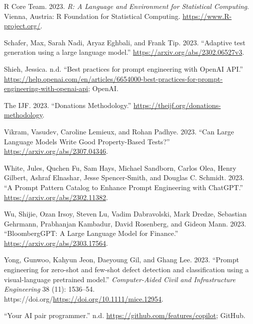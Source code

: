 \documentclass[
  letterpaper,
  DIV=11,
  numbers=noendperiod]{scrartcl}
\newlength{\cslhangindent}
\newlength{\cslentryspacingunit} %
\newenvironment{CSLReferences}[2] %
 {%
  \setlength{\parindent}{0pt}
  \ifodd #1
  \let\oldpar\par
  \def\par{\hangindent=\cslhangindent\oldpar}
  \fi
  \setlength{\parskip}{#2\cslentryspacingunit}
 }%
 {}
\begin{document}
\begin{CSLReferences}{1}{0}
\leavevmode{}%
R Core Team. 2023. \emph{R: A Language and Environment for Statistical
Computing}. Vienna, Austria: R Foundation for Statistical Computing.
\url{https://www.R-project.org/}.

\leavevmode{}%
Schafer, Max, Sarah Nadi, Aryaz Eghbali, and Frank Tip. 2023.
{``{Adaptive test generation using a large language model}.''}
\url{https://arxiv.org/abs/2302.06527v3}.

\leavevmode{}%
Shieh, Jessica. n.d. {``{Best practices for prompt engineering with
OpenAI API}.''}
\url{https://help.openai.com/en/articles/6654000-best-practices-for-prompt-engineering-with-openai-api};
{OpenAI}.

\leavevmode{}%
The IJF. 2023. {``{Donations Methodology}.''}
\url{https://theijf.org/donations-methodology}.

\leavevmode{}%
Vikram, Vasudev, Caroline Lemieux, and Rohan Padhye. 2023. {``{Can Large
Language Models Write Good Property-Based Tests?}''}
\url{https://arxiv.org/abs/2307.04346}.

\leavevmode{}%
White, Jules, Quchen Fu, Sam Hays, Michael Sandborn, Carlos Olea, Henry
Gilbert, Ashraf Elnashar, Jesse Spencer-Smith, and Douglas C. Schmidt.
2023. {``{A Prompt Pattern Catalog to Enhance Prompt Engineering with
ChatGPT}.''} \url{https://arxiv.org/abs/2302.11382}.

\leavevmode{}%
Wu, Shijie, Ozan Irsoy, Steven Lu, Vadim Dabravolski, Mark Dredze,
Sebastian Gehrmann, Prabhanjan Kambadur, David Rosenberg, and Gideon
Mann. 2023. {``{BloombergGPT: A Large Language Model for Finance}.''}
\url{https://arxiv.org/abs/2303.17564}.

\leavevmode{}%
Yong, Gunwoo, Kahyun Jeon, Daeyoung Gil, and Ghang Lee. 2023. {``{Prompt
engineering for zero-shot and few-shot defect detection and
classification using a visual-language pretrained model}.''}
\emph{{Computer-Aided Civil and Infrastructure Engineering}} 38 (11):
1536--54. https://doi.org/\url{https://doi.org/10.1111/mice.12954}.

\leavevmode{}%
{``{Your AI pair programmer}.''} n.d.
\url{https://github.com/features/copilot}; {GitHub}.


\end{CSLReferences}
\end{document}
